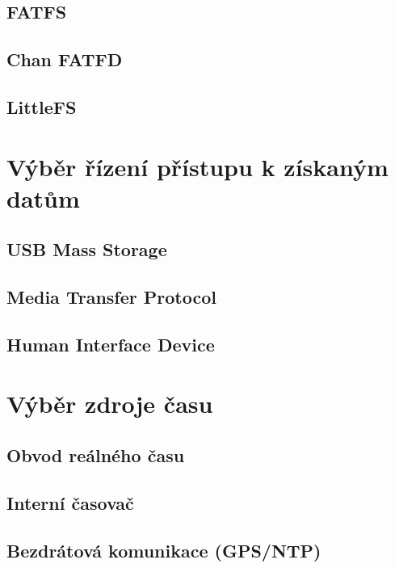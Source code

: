 \subsection{FATFS}

\subsection{Chan FATFD}

\subsection{LittleFS}



\section{Výběr řízení přístupu k získaným datům}

\subsection{USB Mass Storage}

\subsection{Media Transfer Protocol}

\subsection{Human Interface Device}

\section{Výběr zdroje času}

\subsection{Obvod reálného času}

\subsection{Interní časovač}

\subsection{Bezdrátová komunikace (GPS/NTP)}

